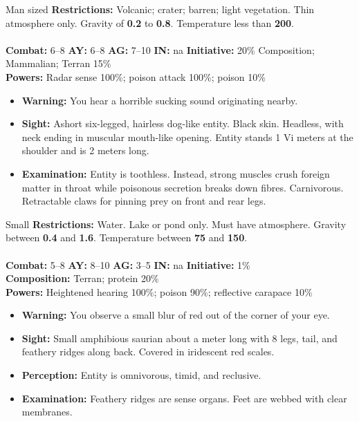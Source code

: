 \hrulefill

  \begin{creature}{Man sized}
    \textbf{Restrictions:} Volcanic; crater; barren; light vegetation. Thin atmosphere only. Gravity of \textbf{0.2} to \textbf{0.8}. Temperature less than \textbf{200\textdegree}. \\\\
    \textbf{Combat:} 6--8 \textbf{AY:} 6--8 \textbf{AG:} 7--10 \textbf{IN:} na \textbf{Initiative:} 20\% 
    Composition; Mammalian; Terran 15\% \\
    \textbf{Powers:} Radar sense 100\%; poison attack 100\%; poison 10\% 
    \begin{itemize}
    \item\textbf{Warning:} You hear a horrible sucking sound originating nearby. 
    \item\textbf{Sight:} Ashort six-legged, hairless dog-like entity. Black skin. Headless, with neck ending in muscular mouth-like opening. Entity 
      stands 1 Vi meters at the shoulder and is 2 meters long. 
    \item\textbf{Examination:} Entity is toothless. Instead, strong muscles crush foreign matter in throat while poisonous secretion breaks down fibres. 
      Carnivorous. Retractable claws for pinning prey on front and rear legs. 
    \end{itemize}
  \end{creature}

\hrulefill

  \begin{creature}{Small}
    \textbf{Restrictions:} Water. Lake or pond only. Must have atmosphere. Gravity between \textbf{0.4} and \textbf{1.6}. Temperature between \textbf{75\textdegree} and \textbf{150\textdegree}. \\\\
    \textbf{Combat:} 5--8 \textbf{AY:} 8--10 \textbf{AG:} 3--5 \textbf{IN:} na \textbf{Initiative:} 1\% \\
    \textbf{Composition:} Terran; protein 20\% \\
    \textbf{Powers:} Heightened hearing 100\%; poison 90\%; reflective carapace 10\% 
    \begin{itemize}
    \item\textbf{Warning:} You observe a small blur of red out of the corner of your eye. 
    \item\textbf{Sight:} Small amphibious saurian about a meter long with 8 legs, tail, and feathery ridges along back. 
      Covered in iridescent red scales. 
    \item\textbf{Perception:} Entity is omnivorous, timid, and reclusive. 
    \item\textbf{Examination:} Feathery ridges are sense organs. Feet are webbed with clear membranes. 
    \end{itemize}
  \end{creature}

